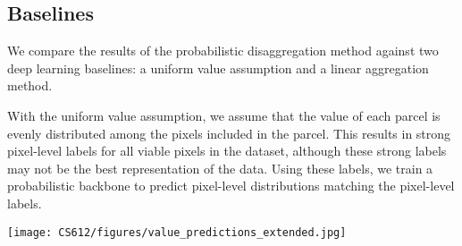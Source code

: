 \documentclass[10pt,twocolumn,a4paper]{article}
\begin{document}



\subsection{Baselines}
\label{sec:baselines}
We compare the results of the probabilistic disaggregation method against two deep learning baselines: a uniform value assumption and a linear aggregation method.

With the uniform value assumption, we assume that the value of each parcel is evenly distributed among the pixels included in the parcel. This results in strong pixel-level labels for all viable pixels in the dataset, although these strong labels may not be the best representation of the data. Using these labels, we train a probabilistic backbone to predict pixel-level distributions matching the pixel-level labels.

\begin{figure*}
        \centering
        \texttt{[image: CS612/figures/value\_predictions\_extended.jpg]}
        \caption{Qualitative examples of mean value predictions of the baselines described in Section~\ref{sec:baselines} and disaggregation model performing on the Hennepin County Dataset~\ref{sec:hennepin}. We show the original input imagery $I$ and parcel regions $Y$ shaded by corresponding value(Columns 1-2). We observe that building pixels are valued more highly than lawn pixels using the disaggregation methods (Columns 3-5). As well, we show the standard deviation predictions of the dissaggregation model (Column 6).}
        \label{fig:qualitative_results}
    \end{figure*}
\end{document}
